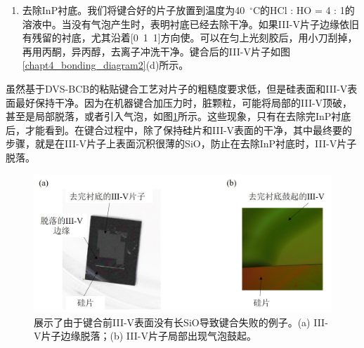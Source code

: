 \begin{enumerate}[(1)]
	\item 去除InP衬底。我们将键合好的片子放置到温度为40~$^{\circ}$C的HCl : HO = 4 : 1的溶液中。当没有气泡产生时，表明衬底已经去除干净。如果III-V片子边缘依旧有残留的衬底，尤其沿着[0~1~1]方向使。可以在匀上光刻胶后，用小刀刮掉，再用丙酮，异丙醇，去离子冲洗干净。键合后的III-V片子如图\ref{chapt4_bonding_diagram2}(d)所示。
\end{enumerate}	

虽然基于DVS-BCB的粘贴键合工艺对片子的粗糙度要求低，但是硅表面和III-V表面最好保持干净。因为在机器键合加压力时，脏颗粒，可能将局部的III-V顶破，甚至是局部脱落，或者引入气泡，如图\ref{chapt4_bonding_error}所示。这些现象，只有在去除完InP衬底后，才能看到。在键合过程中，除了保持硅片和III-V表面的干净，其中最终要的步骤，就是在III-V片子上表面沉积很薄的SiO，防止在去除InP衬底时，III-V片子脱落。
\begin{figure}[htb]
	\centering
	\includegraphics[width=14cm]{./Pictures/chapt4_bonding_error.jpg}
	\caption{展示了由于键合前III-V表面没有长SiO导致键合失败的例子。(a) III-V片子边缘脱落；(b) III-V片子局部出现气泡鼓起。}
	\label{chapt4_bonding_error}
\end{figure}
